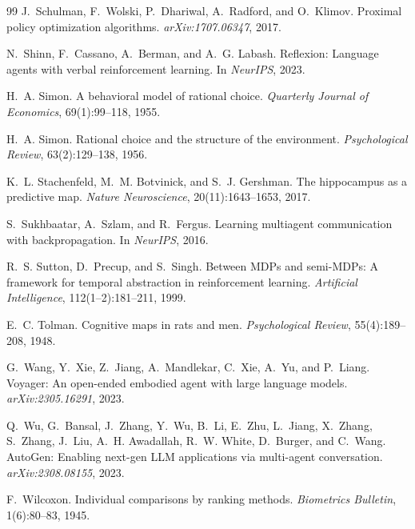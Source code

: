 \documentclass{article}
\begin{document}
\begin{thebibliography}{99}
J.~Schulman, F.~Wolski, P.~Dhariwal, A.~Radford, and O.~Klimov.
\newblock Proximal policy optimization algorithms.
\newblock \emph{arXiv:1707.06347}, 2017.

N.~Shinn, F.~Cassano, A.~Berman, and A.~G. Labash.
\newblock Reflexion: Language agents with verbal reinforcement learning.
\newblock In \emph{NeurIPS}, 2023.

H.~A. Simon.
\newblock A behavioral model of rational choice.
\newblock \emph{Quarterly Journal of Economics}, 69(1):99--118, 1955.

H.~A. Simon.
\newblock Rational choice and the structure of the environment.
\newblock \emph{Psychological Review}, 63(2):129--138, 1956.

K.~L. Stachenfeld, M.~M. Botvinick, and S.~J. Gershman.
\newblock The hippocampus as a predictive map.
\newblock \emph{Nature Neuroscience}, 20(11):1643--1653, 2017.

S.~Sukhbaatar, A.~Szlam, and R.~Fergus.
\newblock Learning multiagent communication with backpropagation.
\newblock In \emph{NeurIPS}, 2016.

R.~S. Sutton, D.~Precup, and S.~Singh.
\newblock Between MDPs and semi-MDPs: A framework for temporal abstraction in reinforcement learning.
\newblock \emph{Artificial Intelligence}, 112(1--2):181--211, 1999.

E.~C. Tolman.
\newblock Cognitive maps in rats and men.
\newblock \emph{Psychological Review}, 55(4):189--208, 1948.

G.~Wang, Y.~Xie, Z.~Jiang, A.~Mandlekar, C.~Xie, A.~Yu, and P.~Liang.
\newblock Voyager: An open-ended embodied agent with large language models.
\newblock \emph{arXiv:2305.16291}, 2023.

Q.~Wu, G.~Bansal, J.~Zhang, Y.~Wu, B.~Li, E.~Zhu, L.~Jiang, X.~Zhang, S.~Zhang, J.~Liu, A.~H. Awadallah, R.~W. White, D.~Burger, and C.~Wang.
\newblock AutoGen: Enabling next-gen LLM applications via multi-agent conversation.
\newblock \emph{arXiv:2308.08155}, 2023.

F.~Wilcoxon.
\newblock Individual comparisons by ranking methods.
\newblock \emph{Biometrics Bulletin}, 1(6):80--83, 1945.


\end{thebibliography}
\end{document}
